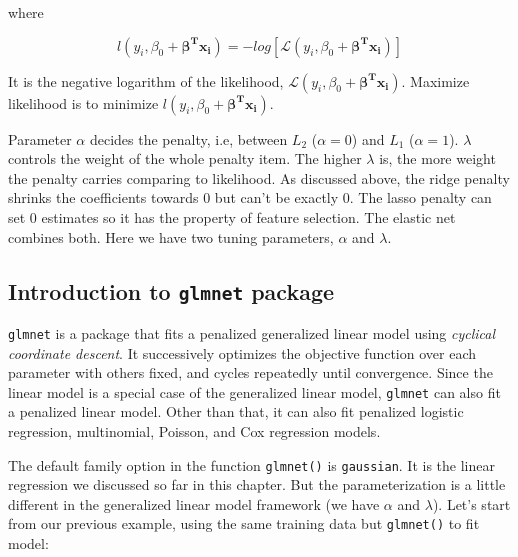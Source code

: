 \documentclass[12pt,]{krantz}
\begin{document}
where

\[l(y_{i},\beta_{0}+\mathbf{\beta^{T}x_{i}})=-log[\mathcal{L}(y_{i},\beta_{0}+\mathbf{\beta^{T}x_{i}})]\]

It is the negative logarithm of the likelihood, \(\mathcal{L}(y_{i},\beta_{0}+\mathbf{\beta^{T}x_{i}})\). Maximize likelihood is to minimize \(l(y_{i},\beta_{0}+\mathbf{\beta^{T}x_{i}})\).

Parameter \(\alpha\) decides the penalty, i.e, between \(L_2\) (\(\alpha=0\)) and \(L_1\) (\(\alpha=1\)). \(\lambda\) controls the weight of the whole penalty item. The higher \(\lambda\) is, the more weight the penalty carries comparing to likelihood. As discussed above, the ridge penalty shrinks the coefficients towards 0 but can't be exactly 0. The lasso penalty can set 0 estimates so it has the property of feature selection. The elastic net combines both. Here we have two tuning parameters, \(\alpha\) and \(\lambda\).

\hypertarget{introduction-to-glmnet-package}{%
\subsection{\texorpdfstring{Introduction to \texttt{glmnet} package}{Introduction to glmnet package}}\label{introduction-to-glmnet-package}}

\texttt{glmnet} is a package that fits a penalized generalized linear model using \emph{cyclical coordinate descent}. It successively optimizes the objective function over each parameter with others fixed, and cycles repeatedly until convergence. Since the linear model is a special case of the generalized linear model, \texttt{glmnet} can also fit a penalized linear model. Other than that, it can also fit penalized logistic regression, multinomial, Poisson, and Cox regression models.

The default family option in the function \texttt{glmnet()} is \texttt{gaussian}. It is the linear regression we discussed so far in this chapter. But the parameterization is a little different in the generalized linear model framework (we have \(\alpha\) and \(\lambda\)). Let's start from our previous example, using the same training data but \texttt{glmnet()} to fit model:
\end{document}
